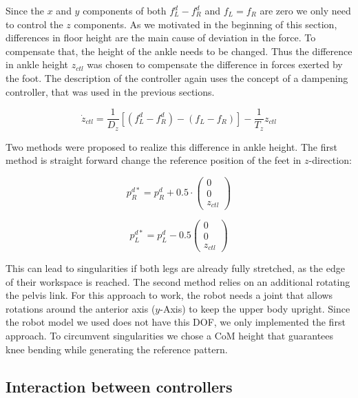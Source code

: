 \documentclass[english,ngerman]{KITreprt}
\begin{document}
Since the $x$ and $y$ components of both $f^d_L - f^d_R$ and $f_L = f_R$
are zero we only need to control the $z$ components. As we motivated in
the beginning of this section, differences in floor height are the main
cause of deviation in the force. To compensate that, the height of the
ankle needs to be changed. Thus the difference in ankle height $z_{ctl}$
was chosen to compensate the difference in forces exerted by the foot.
The description of the controller again uses the concept of a dampening
controller, that was used in the previous sections.

\begin{equation}
\dot{z}_{ctl} = \frac{1}{D_z} [(f^d_L - f^d_R) - (f_L - f_R)] - \frac{1}{T_z} z_{ctl}
\end{equation}

Two methods were proposed to realize this difference in ankle height.
The first method is straight forward change the reference position of
the feet in $z$-direction:

\begin{equation}
p^{d*}_R = p^d_R + 0.5 \cdot \left(\begin{array}{c}0 \\ 0 \\ z_{ctl} \end{array}\right)
\end{equation}

\begin{equation}
p^{d*}_L = p^d_L - 0.5 \left(\begin{array}{c}0 \\ 0 \\ z_{ctl} \end{array}\right)
\end{equation}

This can lead to singularities if both legs are already fully stretched,
as the edge of their workspace is reached. The second method relies on
an additional rotating the pelvis link. For this approach to work, the
robot needs a joint that allows rotations around the anterior axis
($y$-Axis) to keep the upper body upright. Since the robot model we used
does not have this DOF, we only implemented the first approach. To
circumvent singularities we chose a CoM height that guarantees knee
bending while generating the reference pattern.

\subsection{Interaction between
controllers}\label{interaction-between-controllers}
\end{document}
